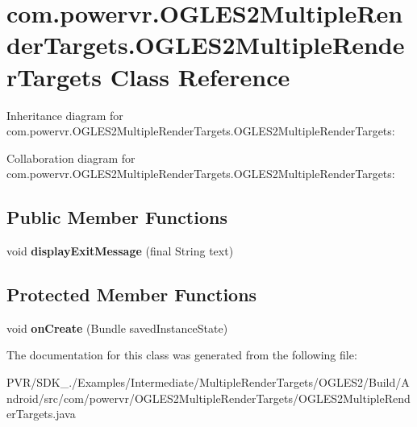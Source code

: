 \hypertarget{classcom_1_1powervr_1_1_o_g_l_e_s2_multiple_render_targets_1_1_o_g_l_e_s2_multiple_render_targets}{\section{com.\+powervr.\+O\+G\+L\+E\+S2\+Multiple\+Render\+Targets.\+O\+G\+L\+E\+S2\+Multiple\+Render\+Targets Class Reference}
\label{classcom_1_1powervr_1_1_o_g_l_e_s2_multiple_render_targets_1_1_o_g_l_e_s2_multiple_render_targets}
}


Inheritance diagram for com.\+powervr.\+O\+G\+L\+E\+S2\+Multiple\+Render\+Targets.\+O\+G\+L\+E\+S2\+Multiple\+Render\+Targets\+:


Collaboration diagram for com.\+powervr.\+O\+G\+L\+E\+S2\+Multiple\+Render\+Targets.\+O\+G\+L\+E\+S2\+Multiple\+Render\+Targets\+:
\subsection*{Public Member Functions}
\begin{DoxyCompactItemize}
\item 
\hypertarget{classcom_1_1powervr_1_1_o_g_l_e_s2_multiple_render_targets_1_1_o_g_l_e_s2_multiple_render_targets_ae97375e370e407418879ed3bf0ae7112}{void {\bfseries display\+Exit\+Message} (final String text)}\label{classcom_1_1powervr_1_1_o_g_l_e_s2_multiple_render_targets_1_1_o_g_l_e_s2_multiple_render_targets_ae97375e370e407418879ed3bf0ae7112}

\end{DoxyCompactItemize}
\subsection*{Protected Member Functions}
\begin{DoxyCompactItemize}
\item 
\hypertarget{classcom_1_1powervr_1_1_o_g_l_e_s2_multiple_render_targets_1_1_o_g_l_e_s2_multiple_render_targets_ab319de1c92cd81ad0b7cb799fe75d779}{void {\bfseries on\+Create} (Bundle saved\+Instance\+State)}\label{classcom_1_1powervr_1_1_o_g_l_e_s2_multiple_render_targets_1_1_o_g_l_e_s2_multiple_render_targets_ab319de1c92cd81ad0b7cb799fe75d779}

\end{DoxyCompactItemize}


The documentation for this class was generated from the following file\+:\begin{DoxyCompactItemize}
\item 
P\+V\+R/\+S\+D\+K\+\_./\+Examples/\+Intermediate/\+Multiple\+Render\+Targets/\+O\+G\+L\+E\+S2/\+Build/\+Android/src/com/powervr/\+O\+G\+L\+E\+S2\+Multiple\+Render\+Targets/O\+G\+L\+E\+S2\+Multiple\+Render\+Targets.\+java\end{DoxyCompactItemize}
